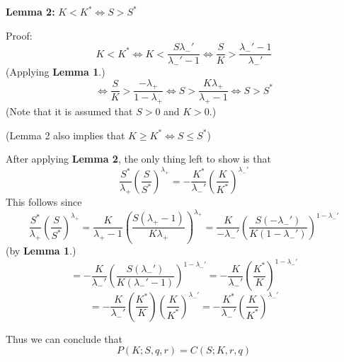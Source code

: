 \documentclass{article}[12pt,a4paper]
\begin{document}
\begin{enumerate}
  \textbf{Lemma 2:} $K < K^* \iff S > S^*$
  
  Proof: 
  $$K < K^* \iff K < \frac{S\lambda_-'}{\lambda_-' - 1} \iff \frac{S}{K} > \frac{\lambda_-' - 1}{\lambda_-'}$$
  \hfill(Applying \textbf{Lemma 1}.)
  $$\iff  \frac{S}{K} > \frac{-\lambda_+}{1 - \lambda_+} \iff  S > \frac{K\lambda_+}{\lambda_+ - 1}
  \iff S > S^*$$
  \hfill(Note that it is assumed that $S > 0$ and $K > 0$.)
  
  (Lemma 2 also implies that $K \ge K^* \iff S \le S^*$)
  
  \pagebreak
  After applying \textbf{Lemma 2}, the only thing left to show is that
  $$\frac{S^*}{\lambda_+}(\frac{S}{S^*})^{\lambda_+} = -\frac{K^*}{\lambda_-'}(\frac{K}{K^*})^{\lambda_-'}$$
  This follows since
  $$\frac{S^*}{\lambda_+}(\frac{S}{S^*})^{\lambda_+} =
  \frac{K}{\lambda_+ - 1}(\frac{S(\lambda_+ - 1)}{K\lambda_+})^{\lambda_+} =
   \frac{K}{-\lambda_-'}(\frac{S(-\lambda_-')}{K(1 - \lambda_-')})^{1 - \lambda_-'}$$
   \hfill(by \textbf{Lemma 1}.)
   $$=  -\frac{K}{\lambda_-'}(\frac{S(\lambda_-')}{K(\lambda_-' - 1)})^{1 - \lambda_-'}
   = -\frac{K}{\lambda_-'}(\frac{K^*}{K})^{1 - \lambda_-'}
   $$ 
    $$=  -\frac{K}{\lambda_-'}(\frac{K^*}{K})(\frac{K}{K^*})^{\lambda_-'}
    = -\frac{K^*}{\lambda_-'}(\frac{K}{K^*})^{\lambda_-'}$$
    
    Thus we can conclude that
    $$P(K; S, q, r) = C(S; K, r, q)$$
  \pagebreak
  

\end{enumerate}
\end{document}
